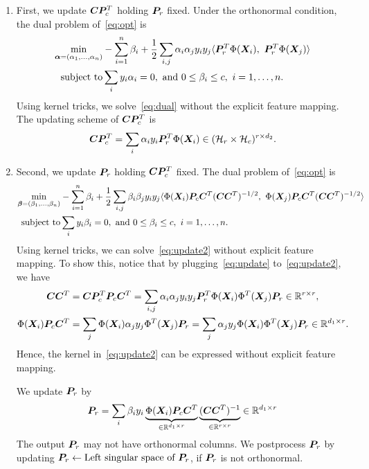 \documentclass[11pt]{article}
\theoremstyle{plain}
\theoremstyle{definition}
\newcommand*{\KeepStyleUnderBrace}[1]{%
  \mathop{%
    \mathchoice
    {\underbrace{\displaystyle#1}}%
    {\underbrace{\textstyle#1}}%
    {\underbrace{\scriptstyle#1}}%
    {\underbrace{\scriptscriptstyle#1}}%
  }\limits
}
\begin{document}
\begin{enumerate}
\item First, we update $\bm C\bm{P}_c^T$ holding $\bm{P}_r$ fixed. 
Under the orthonormal condition, the dual problem of~\eqref{eq:opt} is
\begin{align}\label{eq:dual}
\min_{\boldsymbol{\alpha}=(\alpha_1,\ldots,\alpha_n)} &- \sum_{i=1}^n \beta_i + {1\over 2} \sum_{i,j}\alpha_i\alpha_jy_iy_j\langle 
\bm{P}^T_r\Phi(\bm X_i),\ \bm{P}^T_r\Phi(\bm X_j)
\rangle\\
\text{subject to} & \sum_i y_i\alpha_i=0, \text{ and }0\leq \beta_i\leq c,\ i=1,\ldots,n.
\end{align}
Using kernel tricks, we solve~\eqref{eq:dual} without the explicit feature mapping. The updating scheme of $\bm C\bm{P}_c^T$ is
\begin{align}\label{eq:update}
\bm C\bm{P}_c^T=\sum_i\alpha_iy_i\bm{P}^T_r\Phi(\bm X_i) \in (\mathcal{H}_r\times \mathcal{H}_c)^{r\times d_2}.
\end{align}

\item Second, we update $\bm{P}_r$ holding $\bm C\bm{P}^T_c$ fixed. The dual problem of~\eqref{eq:opt} is
\begin{align}\label{eq:update2}
\min_{\boldsymbol{\beta}=(\beta_1,\ldots,\beta_n)} &- \sum_{i=1}^n \beta_i + {1\over 2} \sum_{i,j}\beta_i\beta_jy_iy_j\langle \Phi(\bm X_i)\bm{P}_c\bm C^T(\bm C\bm C^T)^{-1/2}, \ \Phi(\bm X_j)\bm{P}_c\bm C^T(\bm C\bm C^T)^{-1/2}\rangle\\
\text{subject to} & \sum_i y_i\beta_i=0, \text{ and }0\leq \beta_i\leq c,\ i=1,\ldots,n.
\end{align}
Using kernel tricks, we can solve~\eqref{eq:update2} without explicit feature mapping. To show this, notice that by plugging~\eqref{eq:update} to~\eqref{eq:update2}, we have
\begin{align}
\bm C\bm C^T&=\bm C\bm{P}^T_c\bm{P}_c\bm C^T=\sum_{i,j}\alpha_i\alpha_jy_iy_j\bm{P}_r^T\Phi(\bm X_i)\Phi^T(\bm X_j)\bm{P}_r \in \mathbb{R}^{r\times r},\\
\Phi(\bm X_i)\bm{P}_c\bm C^T&=\sum_j \Phi(\bm X_i) \alpha_jy_j\Phi^T(\bm X_j)\bm{P}_r=\sum_j \alpha_jy_j\Phi(\bm X_i)\Phi^T(\bm X_j) \bm{P}_r \in \mathbb{R}^{d_1\times r}.
\end{align}
Hence, the kernel in~\eqref{eq:update2} can be expressed without explicit feature mapping. 

We update $\bm{P}_r$ by
\[
\mP_r=\sum_{i}\beta_iy_i\KeepStyleUnderBrace{\Phi(\mX_i) \mP_c\mC^T}_{\in\mathbb{R}^{d_1\times r}}\KeepStyleUnderBrace{(\mC\mC^T)^{-1}}_{\in \mathbb{R}^{r\times r}} \in \mathbb{R}^{d_1\times r}
\]
The output $\bm{P}_r$ may not have orthonormal columns. We postprocess $\bm{P}_r$ by {\color{red}updating $\bm{P}_r\leftarrow \text{Left singular space of $\bm{P}_r$}$, if $\bm{P}_r$ is not orthonormal.}
\end{enumerate}
\end{document}
